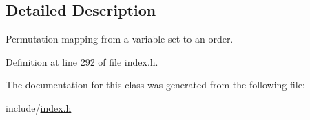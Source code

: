 \subsection{Detailed Description}
Permutation mapping from a variable set to an order. 

Definition at line 292 of file index.\+h.



The documentation for this class was generated from the following file\+:\begin{DoxyCompactItemize}
\item 
include/\hyperlink{index_8h}{index.\+h}\end{DoxyCompactItemize}
